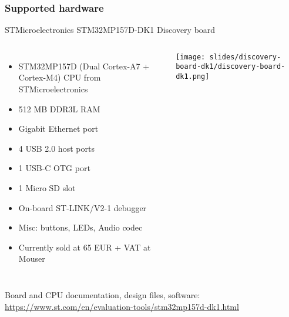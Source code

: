 \begin{frame}
\frametitle{Supported hardware}
  STMicroelectronics STM32MP157D-DK1 Discovery board
  \begin{columns}
    {\footnotesize
    \begin{itemize}
    \item STM32MP157D (Dual Cortex-A7 + Cortex-M4) CPU from STMicroelectronics
    \item 512 MB DDR3L RAM
    \item Gigabit Ethernet port
    \item 4 USB 2.0 host ports
    \item 1 USB-C OTG port
    \item 1 Micro SD slot
    \item On-board ST-LINK/V2-1 debugger
    \item Misc: buttons, LEDs, Audio codec
    \item Currently sold at 65 EUR + VAT at Mouser
    \end{itemize}
    }
    \texttt{[image: slides/discovery-board-dk1/discovery-board-dk1.png]}
  \end{columns}
  \vspace{1em}
  {\small
  Board and CPU documentation, design files, software:
  \url{https://www.st.com/en/evaluation-tools/stm32mp157d-dk1.html}
  }
\end{frame}
